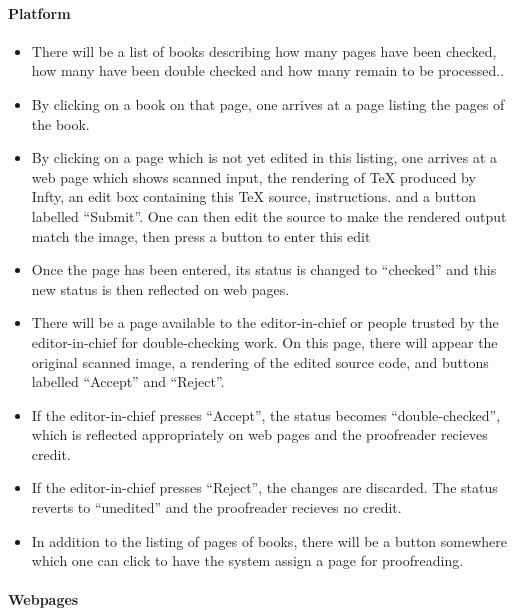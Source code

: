 \begin{itemize}
\begin{itemize}
\paragraph{Platform}

\begin{itemize}
\item
  There will be a list of books describing how many pages have been
  checked, how many have been double checked and how many remain to be
  processed..
\item
  By clicking on a book on that page, one arrives at a page listing the
  pages of the book.
\item
  By clicking on a page which is not yet edited in this listing, one
  arrives at a web page which shows scanned input, the rendering of TeX
  produced by Infty, an edit box containing this TeX source,
  instructions. and a button labelled ``Submit''. One can then edit the
  source to make the rendered output match the image, then press a
  button to enter this edit
\item
  Once the page has been entered, its status is changed to ``checked''
  and this new status is then reflected on web pages.
\item
  There will be a page available to the editor-in-chief or people
  trusted by the editor-in-chief for double-checking work. On this page,
  there will appear the original scanned image, a rendering of the
  edited source code, and buttons labelled ``Accept'' and ``Reject''.
\item
  If the editor-in-chief presses ``Accept'', the status becomes
  ``double-checked'', which is reflected appropriately on web pages and
  the proofreader recieves credit.
\item
  If the editor-in-chief presses ``Reject'', the changes are discarded.
  The status reverts to ``unedited'' and the proofreader recieves no
  credit.
\item
  In addition to the listing of pages of books, there will be a button
  somewhere which one can click to have the system assign a page for
  proofreading.
\end{itemize}

\paragraph{Webpages}


\end{itemize}
\end{itemize}
